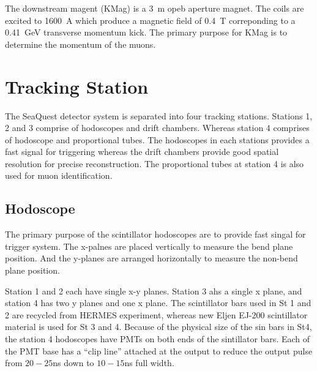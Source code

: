 \documentclass[../main.tex]{subfiles}
\begin{document}
The downstream magent (KMag) is a \SI{3}{\meter} opeb aperture magnet. The coils are excited
to \SI{1600}{\ampere} which produce a magnetic field of \SI{0.4}{\tesla} correponding to a
\SI{0.41}{\GeV} transverse momentum kick. The primary purpose for KMag is to determine
the momentum of the muons.

\section{Tracking Station}
The SeaQuest detector system is separated into four tracking stations. Stations \num{1},
\num{2} and \num{3} comprise of hodoscopes and drift chambers. Whereas station \num{4}
comprises of hodoscope and proportional tubes. The hodoscopes in each stations provides
a fast signal for triggering whereas the drift chambers provide good spatial resolution
for precise reconstruction. The proportional tubes at station 4 is also used for muon
identification.

\subsection{Hodoscope}
The primary purpose of the scintillator hodoscopes are to provide fast singal for
trigger system. The x-palnes are placed vertically to measure the bend plane position.
And the y-planes are arranged horizontally to measure the non-bend plane position.

Station 1 and 2 each have single x-y planes. Station 3 ahs a single x plane, and station
4 has two y planes and one x plane. The scintillator bars used in St 1 and 2 are recycled
from HERMES experiment, whereas new Eljen EJ-200 scintillator material
is used for St 3 and 4. Because of the physical size of the sin bars in St4, the station 4
hodoscopes have PMTs on both ends of the sintillator bars. Each of the PMT base has a
``clip line'' attached at the output to reduce the output pulse from $20-25$\unit{\ns}
down to $10-15$\unit{\ns} full width.
\end{document}
